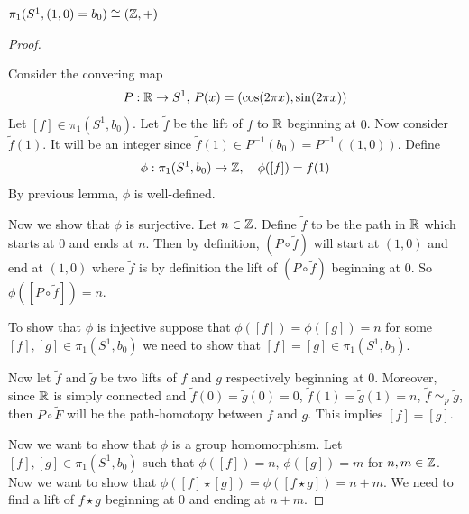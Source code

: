 \documentclass[12pt]{amsart}
\begin{document}
\begin{theorem}
    $\pi_1(S^1, (1,0) = b_0) \cong (\mathbb Z, +)$
\end{theorem}

\begin{proof}
    \bbni
    
    \begin{center}
    \end{center}

    Consider the convering map 
    \[P: \mathbb R \to S^1, \, P(x) = (\cos(2\pi x), \sin(2 \pi x))\]
    Let $[f] \in \pi_1(S^1, b_0)$. Let $\widetilde{f}$ be the lift of $f$ to $\mathbb R$ beginning at $0$. Now consider $\widetilde{f}(1)$. It will be an integer since $\widetilde{f}(1) \in P^{-1}(b_0) = P^{-1}((1,0))$. Define 
    \[\phi: \pi_1 (S^1, b_0) \to \mathbb Z, \quad \phi([f]) = f(1)\] 
    By previous lemma, $\phi$ is well-defined. 

    Now we show that $\phi$ is surjective. Let $n \in \mathbb Z$. Define $\widetilde{f}$ to be the path in $\mathbb R$ which starts at $0$ and ends at $n$. Then by definition, $(P \circ \widetilde{f})$ will start at $(1,0)$ and end at $(1,0)$ where $\widetilde{f}$ is by definition the lift of $(P \circ \widetilde{f})$ beginning at $0$. So $\phi([P \circ \widetilde{f}]) = n$. 

    To show that $\phi$ is injective suppose that $\phi([f]) = \phi([g]) = n$ for some $[f], [g] \in \pi_1(S^1, b_0)$ we need to show that $[f] = [g] \in \pi_1(S^1, b_0)$. 

    Now let $\widetilde{f}$ and $\widetilde{g}$ be two lifts of $f$ and $g$ respectively beginning at $0$. Moreover, since $\mathbb R$ is simply connected and $\widetilde{f}(0) = \widetilde{g}(0) = 0$, $\widetilde{f}(1) = \widetilde{g}(1) = n$, $\widetilde{f} \simeq_p \widetilde{g}$,  then $P \circ \widetilde{F}$ will be the path-homotopy between $f$ and $g$. This implies $[f] = [g]$. 

    Now we want to show that $\phi$ is a group homomorphism. Let $[f], [g] \in \pi_1(S^1, b_0)$ such that $\phi([f]) = n, \, \phi([g]) = m$ for $n, m \in \mathbb Z$. Now we want to show that $\phi([f] \star [g]) = \phi([f \star g]) = n+m$. 
    We need to find a lift of $f \star g$ beginning at $0$ and ending at $n+m$. 


\end{proof}
\end{document}
